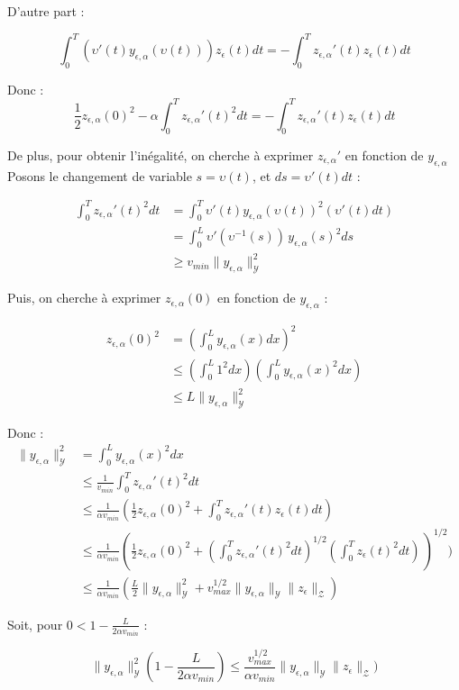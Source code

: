 \documentclass[a4paper]{article}
\newcommand{\Y}{\mathscr{Y}}
\newcommand{\Z}{\mathscr{Z}}
\newcommand{\yea}{y_{\epsilon, \alpha}}
\newcommand{\zea}{z_{\epsilon, \alpha}}
\begin{document}
D'autre part :

\[
\int_0^T (\upsilon'(t)\yea(\upsilon(t))) z_{\epsilon}(t)dt 
= - \int_0^T \zea'(t)z_{\epsilon}(t) dt
\]

Donc :
\[
\displaystyle \frac{1}{2}\zea(0)^2 
	 - \alpha \int_0^T \zea'(t)^2 dt
	 = - \int_0^T \zea'(t)z_{\epsilon}(t) dt
\]

De plus, pour obtenir l'inégalité, 
on cherche à exprimer $\zea'$ en fonction de $\yea$
Posons le changement de variable $s = \upsilon(t)$,
et $ds = \upsilon'(t)dt$ :

\[
\begin{split}
\int_0^T \zea'(t)^2 dt & = \int_0^T \upsilon'(t)\yea(\upsilon(t))^2 (\upsilon'(t)dt) \\
                       & = \int_0^L \upsilon'(\upsilon^{-1}(s)) \, \yea(s)^2 ds\\
					   & \geq v_{min} \| \yea \|_{\Y}^2
\end{split}
\]

Puis, on cherche à exprimer $\zea(0)$ en fonction de $\yea$ :

\[
\begin{split}
	\zea(0)^2 &= (\int_0^L \yea(x)dx)^2 \\
	          & \leq (\int_0^L 1^2dx)(\int_0^L \yea(x)^2 dx) \\
			  & \leq L \| \yea \|_{\Y}^2
\end{split}
\]

Donc :
\[
\begin{split}
\| \yea \|_{\Y}^2 &= \int_0^L \yea(x)^2 dx \\
                  &\leq \displaystyle \frac{1}{v_{min}}
				      \int_0^T \zea'(t)^2 dt \\ 
				  &\leq \displaystyle \frac{1}{\alpha v_{min}}
				      (\displaystyle \frac{1}{2}\zea(0)^2 
				      + \int_0^T \zea'(t)z_{\epsilon}(t) dt)\\
					  &\leq \displaystyle \frac{1}{\alpha v_{min}}
					      (\displaystyle \frac{1}{2}\zea(0)^2 
					      + (\int_0^T \zea'(t)^2 dt)^{1/2}
						   (\int_0^Tz_{\epsilon}(t)^2 dt)\,)^{1/2})\\
				  &\leq \displaystyle \frac{1}{\alpha v_{min}}
				      (\frac{L}{2}  \| \yea \|_{\Y}^2
				      +  v_{max}^{1/2} \| \yea \|_{\Y}
					  \|z_{\epsilon} \|_{\Z})
\end{split}
\]

Soit, pour $0< 1-\displaystyle \frac{L}{2\alpha v_{min}} $  :

\[
\| \yea \|_{\Y}^2 (1-\displaystyle \frac{L}{2\alpha v_{min}})
  \leq \frac{v_{max}^{1/2}}{\alpha v_{min}}  \| \yea \|_{\Y} \|z_{\epsilon} \|_{\Z})
\]				  
\end{document}
